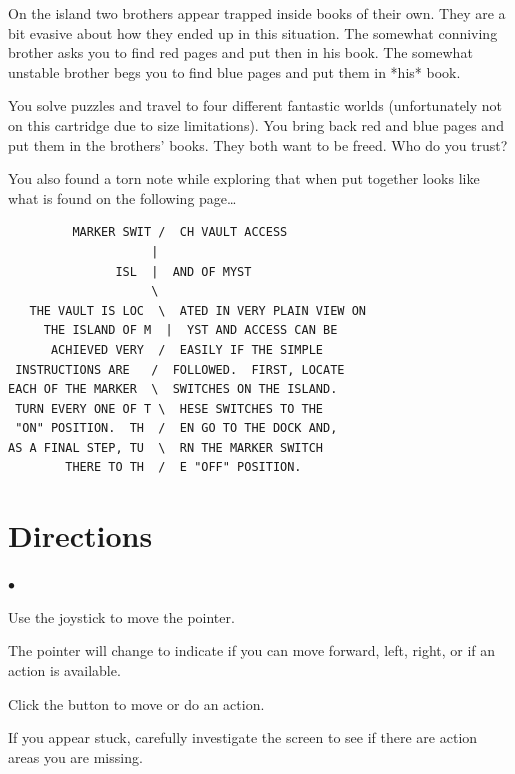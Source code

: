 \documentclass{book}
\newenvironment{list1}%
{\begin{list}{$\bullet$}{\setlength{\parsep}{0.05ex}\setlength{\itemsep}{0mm}}}
{\end{list}\normalsize}
\begin{document}
	On the island two brothers appear trapped inside books
	of their own.  They are a bit evasive about how they
	ended up in this situation.  The somewhat conniving
	brother asks you to find red pages and put then in his book.
	The somewhat unstable brother begs you to find blue pages
	and put them in *his* book.

	You solve puzzles and travel to four different fantastic worlds
	(unfortunately not on this cartridge due to size limitations).
	You bring back red and blue pages and put them in the brothers' books.
	They both want to be freed.  Who do you trust?

	You also found a torn note while exploring that when put together
	looks like what is found on the following page\dots
\vfill

\pagebreak
\begin{small}
\begin{verbatim}
         MARKER SWIT /  CH VAULT ACCESS
                    |
               ISL  |  AND OF MYST
                    \
   THE VAULT IS LOC  \  ATED IN VERY PLAIN VIEW ON
     THE ISLAND OF M  |  YST AND ACCESS CAN BE
      ACHIEVED VERY  /  EASILY IF THE SIMPLE
 INSTRUCTIONS ARE   /  FOLLOWED.  FIRST, LOCATE
EACH OF THE MARKER  \  SWITCHES ON THE ISLAND.
 TURN EVERY ONE OF T \  HESE SWITCHES TO THE
 "ON" POSITION.  TH  /  EN GO TO THE DOCK AND,
AS A FINAL STEP, TU  \  RN THE MARKER SWITCH
        THERE TO TH  /  E "OFF" POSITION.
\end{verbatim}
\end{small}


\pagebreak

\section*{Directions}

\begin{list1}
\item Use the joystick to move the pointer.
\item The pointer will change to indicate if you can move forward, left, right, or
	if an action is available.
\item Click the button to move or do an action.
\item If you appear stuck, carefully investigate the screen to see if there
	are action areas you are missing.
\end{list1}
\end{document}
